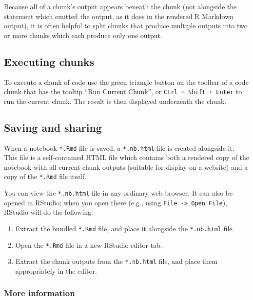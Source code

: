\documentclass[]{book}
\providecommand{\tightlist}{%
  \setlength{\itemsep}{0pt}\setlength{\parskip}{0pt}}
\begin{document}
Because all of a chunk's output appears beneath the chunk (not alongside the statement which
emitted the output, as it does in the rendered R Markdown output), it is often helpful to split
chunks that produce multiple outputs into two or more chunks which each produce only one output.

\hypertarget{executing-chunks}{%
\subsection{Executing chunks}\label{executing-chunks}}

To execute a chunk of code use the green triangle button on the toolbar of a code chunk that has
the tooltip ``Run Current Chunk'', or \texttt{Ctrl\ +\ Shift\ +\ Enter} to run the current chunk. The result is
then displayed underneath the chunk.

\hypertarget{saving-and-sharing}{%
\subsection{Saving and sharing}\label{saving-and-sharing}}

When a notebook \texttt{*.Rmd} file is saved, a \texttt{*.nb.html} file is created alongside it. This file is a
self-contained HTML file which contains both a rendered copy of the notebook with all current chunk
outputs (suitable for display on a website) and a copy of the \texttt{*.Rmd} file itself.

You can view the \texttt{*.nb.html} file in any ordinary web browser. It can also be opened in RStudio;
when you open there (e.g., using \texttt{File\ -\textgreater{}\ Open\ File}), RStudio will do the following:

\begin{enumerate}
\def\labelenumi{\arabic{enumi}.}
\tightlist
\item
  Extract the bundled \texttt{*.Rmd} file, and place it alongside the \texttt{*.nb.html} file.
\item
  Open the \texttt{*.Rmd} file in a new RStudio editor tab.
\item
  Extract the chunk outputs from the \texttt{*.nb.html} file, and place them appropriately in the editor.
\end{enumerate}

\hypertarget{more-information}{%
\subsubsection{More information}\label{more-information}}
\end{document}
